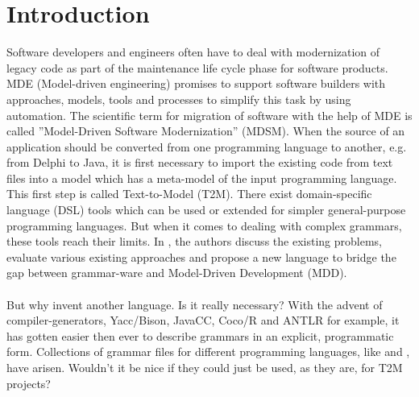 \section{Introduction}
Software developers and engineers often have to deal with 
modernization of legacy code
as part of the maintenance 
life cycle phase for software products. 
MDE (Model-driven engineering) promises to support software
builders with approaches, models, tools and processes to 
simplify this task by using automation.
The scientific term for
migration of software with the help of MDE 
is called 
''Model-Driven Software
Modernization'' (MDSM)\cite{Kowalczyk2009model}.
When the source of an application should be converted from 
one programming language to another, e.g. from Delphi to Java,
it is first necessary to import the existing code from text files
into a model which has a meta-model of the input 
programming language.
This first step is called Text-to-Model (T2M).
There exist domain-specific language (DSL) tools
which can be used or extended for simpler general-purpose
programming languages.
But when it comes to dealing with complex grammars, these tools
reach their limits. 
In \cite{Izquierdo2014extracting},
the authors discuss the existing problems, evaluate various existing
approaches and propose a new language to bridge the gap between
grammar-ware and Model-Driven Development (MDD).
\\ \ \\
But why invent another language. 
Is it really necessary?
With the advent of compiler-generators,
Yacc/Bison\cite{Bison},
JavaCC, 
Coco/R\cite{COCOR} and 
ANTLR\cite{Antlr}
for example,
it has gotten easier then ever to describe 
grammars in an explicit, programmatic form.
Collections of grammar files for different
programming languages, like \cite{Grammarzoo} and 
\cite{grammars_v4}, have arisen.
Wouldn't it be nice if they could just be used,
as they are, for
T2M projects?
